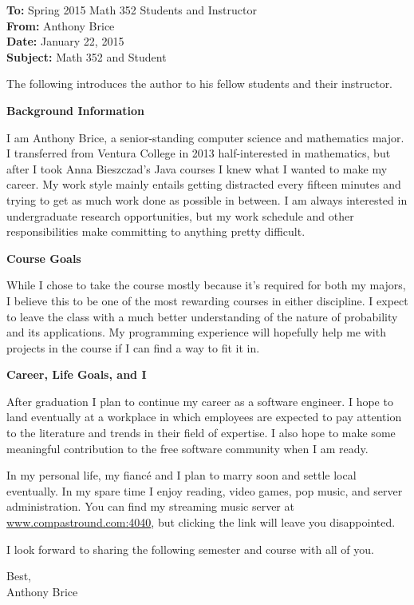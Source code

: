 \documentclass[12pt]{letter} %
\begin{document}
{\sffamily
  \textbf{To:} Spring 2015 Math 352 Students and Instructor\\
  \textbf{From:} Anthony Brice\\ %
  \textbf{Date:} January 22, 2015\\
  \textbf{Subject:} Math 352 and Student}

The following introduces the author to his fellow students and their
instructor.

{\sffamily\textbf{Background Information}}

I am Anthony Brice, a senior-standing computer science and mathematics
major. I transferred from Ventura College in 2013 half-interested in
mathematics, but after I took Anna Bieszczad's Java courses I knew what
I wanted to make my career. My work style mainly entails getting
distracted every fifteen minutes and trying to get as much work done
as possible in between. I am always interested in undergraduate
research opportunities, but my work schedule and other
responsibilities make committing to anything pretty difficult.

{\sffamily\textbf{Course Goals}}

While I chose to take the course mostly because it's required for both
my majors, I believe this to be one of the most rewarding courses in
either discipline. I expect to leave the class with a much better
understanding of the nature of probability and its applications. My
programming experience will hopefully help me with projects in the
course if I can find a way to fit it in.

{\sffamily\textbf{Career, Life Goals, and I}}

After graduation I plan to continue my career as a software
engineer. I hope to land eventually at a workplace in which employees
are expected to pay attention to the literature and trends in their
field of expertise. I also hope to make some meaningful contribution
to the free software community when I am ready.

In my personal life, my fianc\'{e} and I plan to marry soon and settle
local eventually. In my spare time I enjoy reading, video games, pop
music, and server administration. You can find my streaming music
server at \url{www.compastround.com:4040}, but clicking the link will
leave you disappointed.

I look forward to sharing the following semester and course with all
of you.

Best,\\
Anthony Brice
\end{document}
